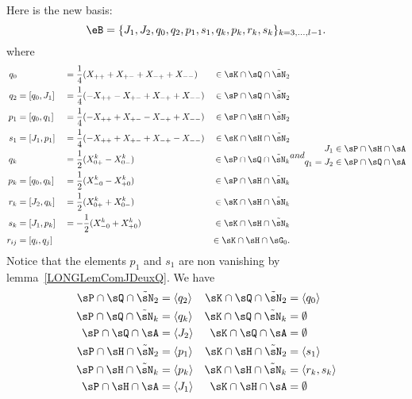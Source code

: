 Here is the new basis:
%
\begin{equation}		\label{LONGEqSuperBaseeB}
	\eB=\{J_1,J_2, q_0,q_2,p_1,s_1,q_k,p_k,r_k,s_k \}_{k=3,\ldots,l-1}.
\end{equation}
%
where
\begin{subequations}		\label{LONGSubEqsBaseSuperTsNTrois}\label{LONGEqDecompqprskXX}
	\begin{align}
		q_0    &            &  & =\frac{1}{ 4 }(X_{++}+X_{+-}+X_{-+}+X_{--})  & \in\sK\cap\sQ\cap\tilde\sN_2                        \\
		q_2    & =[q_0,J_1] &  & =\frac{1}{ 4 }(-X_{++}-X_{+-}+X_{-+}+X_{--}) & \in\sP\cap\sQ\cap\tilde\sN_2                        \\
		p_1    & =[q_0,q_1] &  & =\frac{1}{ 4 }(-X_{++}+X_{+-}-X_{-+}+X_{--}) & \in\sP\cap\sH\cap\tilde\sN_2	\label{LONGEqqzqupuDef} \\
		s_1    & =[J_1,p_1] &  & =\frac{1}{ 4 }(-X_{++}+X_{+-}+X_{-+}-X_{--}) & \in\sK\cap\sH\cap\tilde\sN_2                        \\
		q_k    &            &  & =\frac{ 1 }{2}(X_{0+}^k-X_{0-}^k)            & \in\sP\cap\sQ\cap\tilde\sN_k                        \\
		p_k    & =[q_0,q_k] &  & =\frac{ 1 }{ 2 }(X_{-0}^k-X_{+0}^k)          & \in\sP\cap\sH\cap\tilde\sN_k                        \\
		r_k    & =[J_2,q_k] &  & =\frac{ 1 }{2}(X^k_{0+}+X^k_{0-})            & \in\sK\cap\sH\cap\tilde\sN_k                        \\
		s_k    & =[J_1,p_k] &  & =-\frac{ 1 }{2}(X^k_{-0}+X^k_{+0})           & \in\sK\cap\sH\cap\tilde\sN_k                        \\
		r_{ij} & =[q_i,q_j] &  &                                              & \in\sK\cap\sH\cap\sG_0.
	\end{align}
	and
	\begin{align}
		J_1     & \in\sP\cap\sH\cap\sA \\
		q_1=J_2 & \in\sP\cap\sQ\cap\sA
	\end{align}
\end{subequations}
Notice that the elements $p_1$ and $s_1$ are non vanishing by lemma~\ref{LONGLemComJDeuxQ}. We have
\begin{subequations}
	\begin{align}
		\sP\cap\sQ\cap\tilde\sN_2 & =\langle q_2\rangle & \sK\cap\sQ\cap\tilde\sN_2 & =\langle q_0\rangle     \\
		\sP\cap\sQ\cap\tilde\sN_k & =\langle q_k\rangle & \sK\cap\sQ\cap\tilde\sN_k & =\emptyset              \\
		\sP\cap\sQ\cap\sA         & =\langle J_2\rangle & \sK\cap\sQ\cap\sA         & = \emptyset             \\
		\sP\cap\sH\cap\tilde\sN_2 & =\langle p_1\rangle & \sK\cap\sH\cap\tilde\sN_2 & =\langle s_1\rangle     \\
		\sP\cap\sH\cap\tilde\sN_k & =\langle p_k\rangle & \sK\cap\sH\cap\tilde\sN_k & =\langle r_k,s_k\rangle \\
		\sP\cap\sH\cap\sA         & =\langle J_1\rangle & \sK\cap\sH\cap\sA         & =\emptyset
	\end{align}
\end{subequations}
